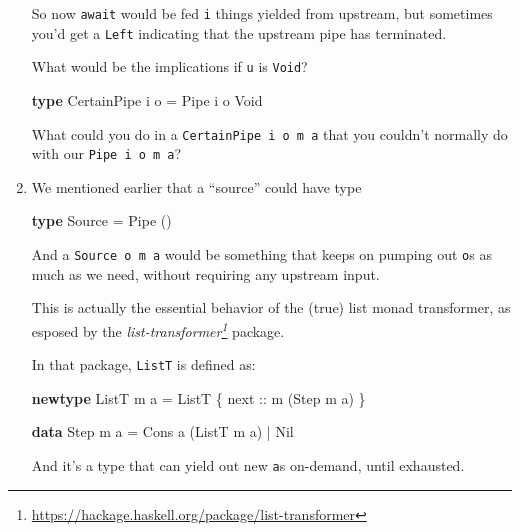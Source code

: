 \documentclass[]{article}
\newenvironment{Shaded}{}{}
\newcommand{\DataTypeTok}[1]{\textcolor[rgb]{0.56,0.13,0.00}{#1}}
\newcommand{\KeywordTok}[1]{\textcolor[rgb]{0.00,0.44,0.13}{\textbf{#1}}}
\newcommand{\NormalTok}[1]{#1}
\newcommand{\OperatorTok}[1]{\textcolor[rgb]{0.40,0.40,0.40}{#1}}
\newcommand{\OtherTok}[1]{\textcolor[rgb]{0.00,0.44,0.13}{#1}}
\renewcommand{\href}[2]{#2\footnote{\url{#1}}}
\begin{document}
\begin{enumerate}
  So now \texttt{await} would be fed \texttt{i} things yielded from upstream,
  but sometimes you'd get a \texttt{Left} indicating that the upstream pipe has
  terminated.

  What would be the implications if \texttt{u} is \texttt{Void}?

\begin{Shaded}
\begin{Highlighting}[]
\KeywordTok{type} \DataTypeTok{CertainPipe}\NormalTok{ i o }\OtherTok{=} \DataTypeTok{Pipe}\NormalTok{ i o }\DataTypeTok{Void}
\end{Highlighting}
\end{Shaded}

  What could you do in a \texttt{CertainPipe\ i\ o\ m\ a} that you couldn't
  normally do with our \texttt{Pipe\ i\ o\ m\ a}?
\item
  We mentioned earlier that a ``source'' could have type

\begin{Shaded}
\begin{Highlighting}[]
\KeywordTok{type} \DataTypeTok{Source} \OtherTok{=} \DataTypeTok{Pipe}\NormalTok{ ()}
\end{Highlighting}
\end{Shaded}

  And a \texttt{Source\ o\ m\ a} would be something that keeps on pumping out
  \texttt{o}s as much as we need, without requiring any upstream input.

  This is actually the essential behavior of the (true) list monad transformer,
  as esposed by the
  \emph{\href{https://hackage.haskell.org/package/list-transformer}{list-transformer}}
  package.

  In that package, \texttt{ListT} is defined as:

\begin{Shaded}
\begin{Highlighting}[]
\KeywordTok{newtype} \DataTypeTok{ListT}\NormalTok{ m a }\OtherTok{=} \DataTypeTok{ListT}\NormalTok{ \{}\OtherTok{ next ::}\NormalTok{ m (}\DataTypeTok{Step}\NormalTok{ m a) \}}

\KeywordTok{data} \DataTypeTok{Step}\NormalTok{ m a }\OtherTok{=} \DataTypeTok{Cons}\NormalTok{ a (}\DataTypeTok{ListT}\NormalTok{ m a) }\OperatorTok{|} \DataTypeTok{Nil}
\end{Highlighting}
\end{Shaded}

  And it's a type that can yield out new \texttt{a}s on-demand, until exhausted.


\end{enumerate}
\end{document}
